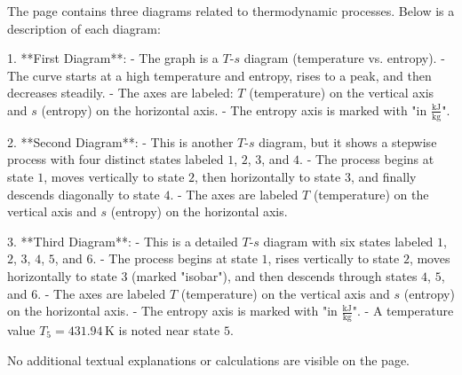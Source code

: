 The page contains three diagrams related to thermodynamic processes. Below is a description of each diagram:

1. **First Diagram**:  
   - The graph is a \( T \)-\( s \) diagram (temperature vs. entropy).  
   - The curve starts at a high temperature and entropy, rises to a peak, and then decreases steadily.  
   - The axes are labeled: \( T \) (temperature) on the vertical axis and \( s \) (entropy) on the horizontal axis.  
   - The entropy axis is marked with "in \( \frac{\text{kJ}}{\text{kg}} \)".

2. **Second Diagram**:  
   - This is another \( T \)-\( s \) diagram, but it shows a stepwise process with four distinct states labeled \( 1 \), \( 2 \), \( 3 \), and \( 4 \).  
   - The process begins at state \( 1 \), moves vertically to state \( 2 \), then horizontally to state \( 3 \), and finally descends diagonally to state \( 4 \).  
   - The axes are labeled \( T \) (temperature) on the vertical axis and \( s \) (entropy) on the horizontal axis.

3. **Third Diagram**:  
   - This is a detailed \( T \)-\( s \) diagram with six states labeled \( 1 \), \( 2 \), \( 3 \), \( 4 \), \( 5 \), and \( 6 \).  
   - The process begins at state \( 1 \), rises vertically to state \( 2 \), moves horizontally to state \( 3 \) (marked "isobar"), and then descends through states \( 4 \), \( 5 \), and \( 6 \).  
   - The axes are labeled \( T \) (temperature) on the vertical axis and \( s \) (entropy) on the horizontal axis.  
   - The entropy axis is marked with "in \( \frac{\text{kJ}}{\text{kg}} \)".  
   - A temperature value \( T_5 = 431.94 \, \text{K} \) is noted near state \( 5 \).

No additional textual explanations or calculations are visible on the page.